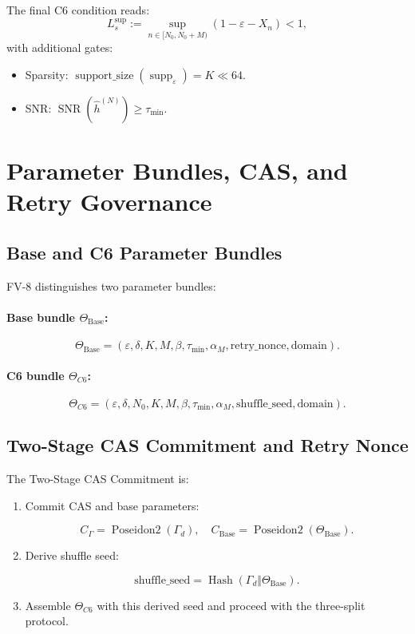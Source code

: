 \documentclass[11pt]{article}
\begin{document}
The final C6 condition reads:
\[
L_s^{\sup} := \sup_{n \in [N_0, N_0 + M)} (1 - \varepsilon - X_n) < 1,
\]
with additional gates:

\begin{itemize}[nosep]
  \item Sparsity: $\operatorname{support\_size}(\operatorname{supp}_\varepsilon) = K \ll 64$.
  \item SNR: $\operatorname{SNR}(\hat{h}^{(N)}) \ge \tau_{\min}$.
\end{itemize}

\section{Parameter Bundles, CAS, and Retry Governance}

\subsection{Base and C6 Parameter Bundles}

FV-8 distinguishes two parameter bundles:

\paragraph{Base bundle $\Theta_{\text{Base}}$:}
\[
\Theta_{\text{Base}} =
(\varepsilon, \delta, K, M, \beta, \tau_{\min}, \alpha_M, \text{retry\_nonce}, \text{domain}).
\]

\paragraph{C6 bundle $\Theta_{C6}$:}
\[
\Theta_{C6} = (\varepsilon, \delta, N_0, K, M, \beta, \tau_{\min}, \alpha_M, \text{shuffle\_seed}, \text{domain}).
\]

\subsection{Two-Stage CAS Commitment and Retry Nonce}

The Two-Stage CAS Commitment is:

\begin{enumerate}[nosep]
  \item Commit CAS and base parameters:

  \[
  C_{\Gamma} = \operatorname{Poseidon2}(\Gamma_d), \quad
  C_{\text{Base}} = \operatorname{Poseidon2}(\Theta_{\text{Base}}).
  \]

  \item Derive shuffle seed:

  \[
  \text{shuffle\_seed} =
  \operatorname{Hash}(\Gamma_d \Vert \Theta_{\text{Base}}).
  \]

  \item Assemble $\Theta_{C6}$ with this derived seed and proceed with the three-split protocol.
\end{enumerate}
\end{document}
